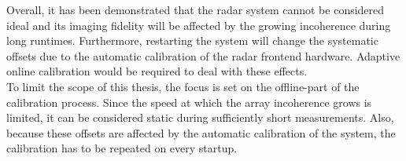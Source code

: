 Overall, it has been demonstrated that the radar system cannot be considered ideal and
its imaging fidelity will be affected by the growing incoherence during long runtimes.
Furthermore, restarting the system will change the systematic offsets due to the automatic calibration of the radar frontend hardware.
Adaptive online calibration would be required to deal with these effects. \\

To limit the scope of this thesis, the focus is set on the offline-part of the calibration process.
Since the speed at which the array incoherence grows is limited, it can be considered static during sufficiently short measurements.
Also, because these offsets are affected by the automatic calibration of the system, the calibration has to be repeated on every startup.
